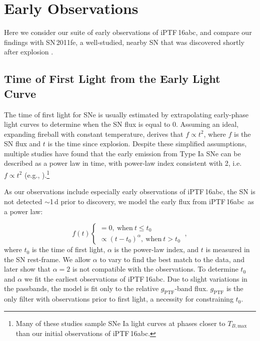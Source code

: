 \documentclass[twocolumn]{aastex61}
\newcommand{\abc}{iPTF\,16abc}
\begin{document}
\section{Early Observations}
\label{sec:first_light}

Here we consider our suite of early observations of \abc, and compare our
findings with SN\,2011fe, a well-studied, nearby SN that was discovered
shortly after explosion
\citep{2011Natur.480..344N,2012ApJ...744L..17B,2014ApJ...784...85P}.

\subsection{Time of First Light from the Early Light Curve}
\label{sec:lc_fit}

The time of first light for SNe is usually estimated by extrapolating
early-phase light curves to determine when the SN flux is equal to 0.
Assuming an ideal, expanding fireball with constant temperature,
\citet{1982ApJ...253..785A} derives that $f \propto t^2$, where $f$ is the SN
flux and $t$ is the time since explosion. Despite these simplified assumptions, multiple studies have found that the
early emission from Type Ia SNe can be described as a power law in time, with
power-law index consistent with 2, i.e. $f \propto t^2$ (e.g.,
\citealt{2006AJ....132.1707C, 2010ApJ...712..350H,
2011MNRAS.416.2607G}).\footnote{Many of these studies
sample SNe Ia light curves at phases closer to $T_{B,\mathrm{max}}$
than our initial observations of \abc.}

As our observations include especially early observations of \abc, the SN is
not detected $\sim$1\,d prior to discovery, we model the early flux from \abc\
as a power law:

\begin{equation}
  \label{eq:broken_power_law}
  f(t) \left\{
    \begin{array}{ll}
      = 0,\ \textrm{when}\ t \le t_0 \\
      \propto (t-t_0)^{\alpha},\ \textrm{when}\ t>t_0
    \end{array}
  \right.\ ,
\end{equation}
% 
where $t_0$ is the time of first light, $\alpha$ is the power-law index, and
$t$ is measured in the SN rest-frame. We allow $\alpha$ to vary to
find the best match to the data, and later show that $\alpha = 2$ is not
compatible with the observations. To determine $t_0$ and $\alpha$ we fit the
earliest observations of \abc. Due to slight variations in the passbands, the
model is fit only to the relative $g_\mathrm{PTF}$-band flux. $g_\mathrm{PTF}$
is the only filter with observations prior to first light, a necessity for
constraining $t_0$.
\end{document}
